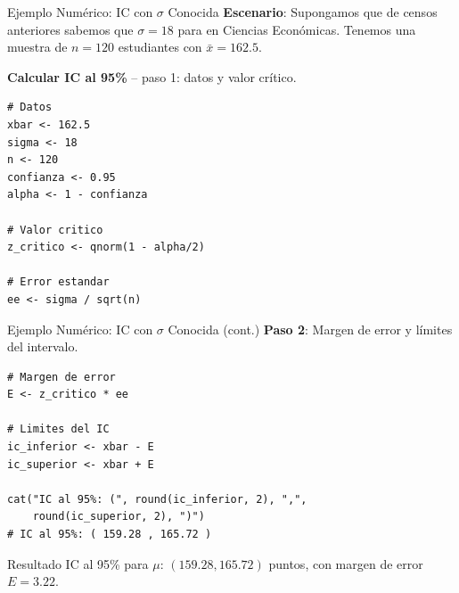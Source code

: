 \documentclass[aspectratio=169, 11pt]{beamer}
\begin{document}
\begin{frame}[fragile]{Ejemplo Numérico: IC con $\sigma$ Conocida}
\textbf{Escenario}: Supongamos que de censos anteriores sabemos que $\sigma = 18$ para  en Ciencias Econ\'omicas. Tenemos una muestra de $n = 120$ estudiantes con $\bar{x} = 162.5$.

\vspace{0.2cm}
\textbf{Calcular IC al 95\%} -- paso 1: datos y valor crítico.

\begin{lstlisting}
# Datos
xbar <- 162.5
sigma <- 18
n <- 120
confianza <- 0.95
alpha <- 1 - confianza

# Valor critico
z_critico <- qnorm(1 - alpha/2)

# Error estandar
ee <- sigma / sqrt(n)
\end{lstlisting}
\end{frame}

\begin{frame}[fragile]{Ejemplo Numérico: IC con $\sigma$ Conocida (cont.)}
\textbf{Paso 2}: Margen de error y límites del intervalo.

\begin{lstlisting}
# Margen de error
E <- z_critico * ee

# Limites del IC
ic_inferior <- xbar - E
ic_superior <- xbar + E

cat("IC al 95%: (", round(ic_inferior, 2), ",",
    round(ic_superior, 2), ")")
# IC al 95%: ( 159.28 , 165.72 )
\end{lstlisting}

\vspace{0.3cm}
\begin{exampleblock}{Resultado}
IC al 95\% para $\mu$: $(159.28, 165.72)$ puntos, con margen de error $E = 3.22$.
\end{exampleblock}
\end{frame}
\end{document}
